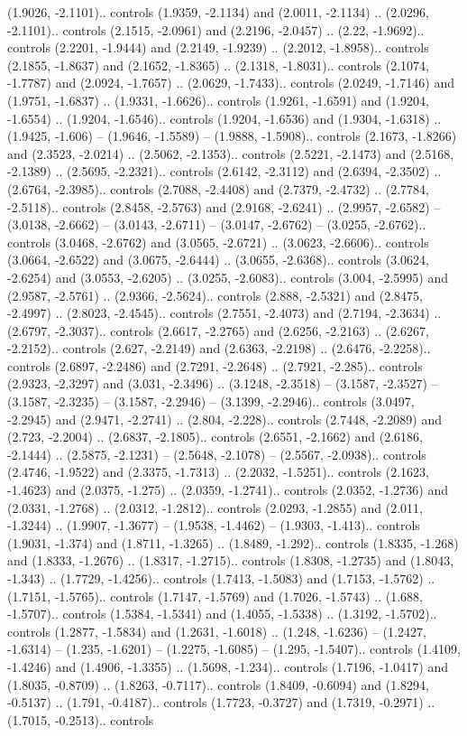 {(1.9026, -2.1101).. controls (1.9359, -2.1134) and (2.0011, -2.1134) .. (2.0296, -2.1101).. controls (2.1515, -2.0961) and (2.2196, -2.0457) .. (2.22, -1.9692).. controls (2.2201, -1.9444) and (2.2149, -1.9239) .. (2.2012, -1.8958).. controls (2.1855, -1.8637) and (2.1652, -1.8365) .. (2.1318, -1.8031).. controls (2.1074, -1.7787) and (2.0924, -1.7657) .. (2.0629, -1.7433).. controls (2.0249, -1.7146) and (1.9751, -1.6837) .. (1.9331, -1.6626).. controls (1.9261, -1.6591) and (1.9204, -1.6554) .. (1.9204, -1.6546).. controls (1.9204, -1.6536) and (1.9304, -1.6318) .. (1.9425, -1.606) -- (1.9646, -1.5589) -- (1.9888, -1.5908).. controls (2.1673, -1.8266) and (2.3523, -2.0214) .. (2.5062, -2.1353).. controls (2.5221, -2.1473) and (2.5168, -2.1389) .. (2.5695, -2.2321).. controls (2.6142, -2.3112) and (2.6394, -2.3502) .. (2.6764, -2.3985).. controls (2.7088, -2.4408) and (2.7379, -2.4732) .. (2.7784, -2.5118).. controls (2.8458, -2.5763) and (2.9168, -2.6241) .. (2.9957, -2.6582) -- (3.0138, -2.6662) -- (3.0143, -2.6711) -- (3.0147, -2.6762) -- (3.0255, -2.6762).. controls (3.0468, -2.6762) and (3.0565, -2.6721) .. (3.0623, -2.6606).. controls (3.0664, -2.6522) and (3.0675, -2.6444) .. (3.0655, -2.6368).. controls (3.0624, -2.6254) and (3.0553, -2.6205) .. (3.0255, -2.6083).. controls (3.004, -2.5995) and (2.9587, -2.5761) .. (2.9366, -2.5624).. controls (2.888, -2.5321) and (2.8475, -2.4997) .. (2.8023, -2.4545).. controls (2.7551, -2.4073) and (2.7194, -2.3634) .. (2.6797, -2.3037).. controls (2.6617, -2.2765) and (2.6256, -2.2163) .. (2.6267, -2.2152).. controls (2.627, -2.2149) and (2.6363, -2.2198) .. (2.6476, -2.2258).. controls (2.6897, -2.2486) and (2.7291, -2.2648) .. (2.7921, -2.285).. controls (2.9323, -2.3297) and (3.031, -2.3496) .. (3.1248, -2.3518) -- (3.1587, -2.3527) -- (3.1587, -2.3235) -- (3.1587, -2.2946) -- (3.1399, -2.2946).. controls (3.0497, -2.2945) and (2.9471, -2.2741) .. (2.804, -2.228).. controls (2.7448, -2.2089) and (2.723, -2.2004) .. (2.6837, -2.1805).. controls (2.6551, -2.1662) and (2.6186, -2.1444) .. (2.5875, -2.1231) -- (2.5648, -2.1078) -- (2.5567, -2.0938).. controls (2.4746, -1.9522) and (2.3375, -1.7313) .. (2.2032, -1.5251).. controls (2.1623, -1.4623) and (2.0375, -1.275) .. (2.0359, -1.2741).. controls (2.0352, -1.2736) and (2.0331, -1.2768) .. (2.0312, -1.2812).. controls (2.0293, -1.2855) and (2.011, -1.3244) .. (1.9907, -1.3677) -- (1.9538, -1.4462) -- (1.9303, -1.413).. controls (1.9031, -1.374) and (1.8711, -1.3265) .. (1.8489, -1.292).. controls (1.8335, -1.268) and (1.8333, -1.2676) .. (1.8317, -1.2715).. controls (1.8308, -1.2735) and (1.8043, -1.343) .. (1.7729, -1.4256).. controls (1.7413, -1.5083) and (1.7153, -1.5762) .. (1.7151, -1.5765).. controls (1.7147, -1.5769) and (1.7026, -1.5743) .. (1.688, -1.5707).. controls (1.5384, -1.5341) and (1.4055, -1.5338) .. (1.3192, -1.5702).. controls (1.2877, -1.5834) and (1.2631, -1.6018) .. (1.248, -1.6236) -- (1.2427, -1.6314) -- (1.235, -1.6201) -- (1.2275, -1.6085) -- (1.295, -1.5407).. controls (1.4109, -1.4246) and (1.4906, -1.3355) .. (1.5698, -1.234).. controls (1.7196, -1.0417) and (1.8035, -0.8709) .. (1.8263, -0.7117).. controls (1.8409, -0.6094) and (1.8294, -0.5137) .. (1.791, -0.4187).. controls (1.7723, -0.3727) and (1.7319, -0.2971) .. (1.7015, -0.2513).. controls }
